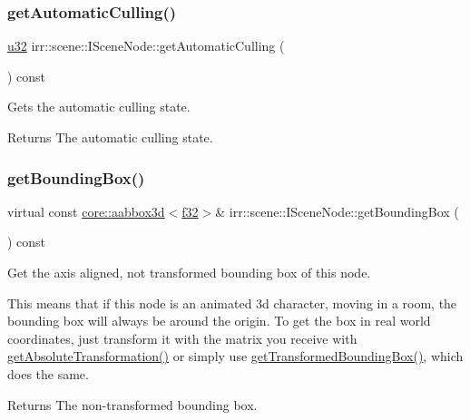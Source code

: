\subsubsection{\texorpdfstring{get\+Automatic\+Culling()}{getAutomaticCulling()}\hspace{0.1cm}{\footnotesize\ttfamily [2/2]}}
{\footnotesize\ttfamily \hyperlink{namespaceirr_a0416a53257075833e7002efd0a18e804}{u32} irr\+::scene\+::\+I\+Scene\+Node\+::get\+Automatic\+Culling (\begin{DoxyParamCaption}{ }\end{DoxyParamCaption}) const\hspace{0.3cm}{\ttfamily [inline]}}



Gets the automatic culling state. 

\begin{DoxyReturn}{Returns}
The automatic culling state. 
\end{DoxyReturn}
\mbox{\label{classirr_1_1scene_1_1ISceneNode_a223f718fc2f4944b5ad28c592f6cc8c6}} 
\subsubsection{\texorpdfstring{get\+Bounding\+Box()}{getBoundingBox()}\hspace{0.1cm}{\footnotesize\ttfamily [1/2]}}
{\footnotesize\ttfamily virtual const \hyperlink{classirr_1_1core_1_1aabbox3d}{core\+::aabbox3d}$<$\hyperlink{namespaceirr_a0277be98d67dc26ff93b1a6a1d086b07}{f32}$>$\& irr\+::scene\+::\+I\+Scene\+Node\+::get\+Bounding\+Box (\begin{DoxyParamCaption}{ }\end{DoxyParamCaption}) const\hspace{0.3cm}{\ttfamily [pure virtual]}}



Get the axis aligned, not transformed bounding box of this node. 

This means that if this node is an animated 3d character, moving in a room, the bounding box will always be around the origin. To get the box in real world coordinates, just transform it with the matrix you receive with \hyperlink{classirr_1_1scene_1_1ISceneNode_af13dc546a7be796cc0868a2eec51e508}{get\+Absolute\+Transformation()} or simply use \hyperlink{classirr_1_1scene_1_1ISceneNode_a77746edcc479107067fbf1f4471ab412}{get\+Transformed\+Bounding\+Box()}, which does the same. \begin{DoxyReturn}{Returns}
The non-\/transformed bounding box. 
\end{DoxyReturn}


